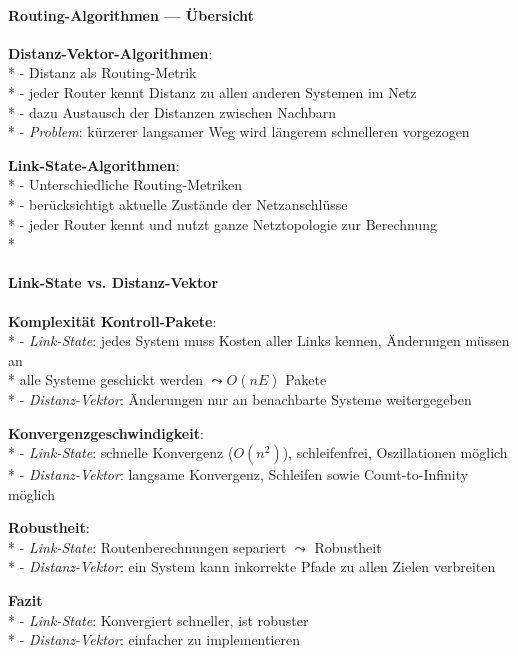\paragraph{Routing-Algorithmen --- Übersicht}
\begin{items}
  \item \textbf{Distanz-Vektor-Algorithmen}: \\*
  	- Distanz als Routing-Metrik \\*
    - jeder Router kennt Distanz zu allen anderen Systemen im Netz \\*
    - dazu Austausch der Distanzen zwischen Nachbarn\\*
    - \emph{Problem}: kürzerer langsamer Weg wird längerem schnelleren vorgezogen
  \item \textbf{Link-State-Algorithmen}: \\*
  	- Unterschiedliche Routing-Metriken \\*
    - berücksichtigt aktuelle Zustände der Netzanschlüsse \\*
    - jeder Router kennt und nutzt ganze Netztopologie zur Berechnung \\*
\end{items}

\paragraph{Link-State vs. Distanz-Vektor}
\begin{items}
	\item \textbf{Komplexität Kontroll-Pakete}: \\*
	- \emph{Link-State}: jedes System muss Kosten aller Links kennen, Änderungen müssen an \\* \phantom{-} \phantom{\( \cdot \)} alle Systeme geschickt werden \( \leadsto  O(nE) \) Pakete\\*
	- \emph{Distanz-Vektor}: Änderungen nur an benachbarte Systeme weitergegeben
	\item \textbf{Konvergenzgeschwindigkeit}: \\*
	- \emph{Link-State}: schnelle Konvergenz (\( O(n^2) \)),  schleifenfrei, Oszillationen möglich \\*
	- \emph{Distanz-Vektor}: langsame Konvergenz, Schleifen sowie Count-to-Infinity möglich
	\item \textbf{Robustheit}: \\*
	- \emph{Link-State}: Routenberechnungen separiert \( \leadsto \) Robustheit \\*
	- \emph{Distanz-Vektor}: ein System kann inkorrekte Pfade zu allen Zielen verbreiten
	\item \textbf{Fazit} \\*
	- \emph{Link-State}: Konvergiert schneller, ist robuster \\*
	- \emph{Distanz-Vektor}: einfacher zu implementieren
\end{items}

